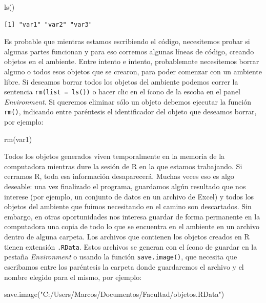 \documentclass[
]{book}
\newenvironment{Shaded}{\begin{snugshade}}{\end{snugshade}}
\newcommand{\FunctionTok}[1]{\textcolor[rgb]{0.00,0.00,0.00}{#1}}
\newcommand{\NormalTok}[1]{#1}
\newcommand{\StringTok}[1]{\textcolor[rgb]{0.31,0.60,0.02}{#1}}
\begin{document}
\begin{Shaded}
\begin{Highlighting}[]
\FunctionTok{ls}\NormalTok{()}
\end{Highlighting}
\end{Shaded}

\begin{verbatim}
[1] "var1" "var2" "var3"
\end{verbatim}

Es probable que mientras estamos escribiendo el código, necesitemos probar si algunas partes funcionan y para eso corremos algunas líneas de código, creando objetos en el ambiente. Entre intento e intento, probablemnte necesitemos borrar alguno o todos esos objetos que se crearon, para poder comenzar con un ambiente libre. Si deseamos borrar todos los objetos del ambiente podemos correr la sentencia \texttt{rm(list\ =\ ls())} o hacer clic en el ícono de la escoba en el panel \emph{Environment}. Si queremos eliminar sólo un objeto debemos ejecutar la función \texttt{rm()}, indicando entre paréntesis el identificador del objeto que deseamos borrar, por ejemplo:

\begin{Shaded}
\begin{Highlighting}[]
\FunctionTok{rm}\NormalTok{(var1)}
\end{Highlighting}
\end{Shaded}

Todos los objetos generados viven temporalmente en la memoria de la computadora mientras dure la sesión de R en la que estamos trabajando. Si cerramos R, toda esa información desaparecerá. Muchas veces eso es algo deseable: una vez finalizado el programa, guardamos algún resultado que nos interese (por ejemplo, un conjunto de datos en un archivo de Excel) y todos los objetos del ambiente que fuimos necesitando en el camino son descartados. Sin embargo, en otras oportunidades nos interesa guardar de forma permanente en la computadora una copia de todo lo que se encuentra en el ambiente en un archivo dentro de alguna carpeta. Los archivos que contienen los objetos creados en R tienen extensión \texttt{.RData}. Estos archivos se generan con el ícono de guardar en la pestaña \emph{Environment} o usando la función \texttt{save.image()}, que necesita que escribamos entre los paréntesis la carpeta donde guardaremos el archivo y el nombre elegido para el mismo, por ejemplo:

\begin{Shaded}
\begin{Highlighting}[]
\FunctionTok{save.image}\NormalTok{(}\StringTok{"C:/Users/Marcos/Documentos/Facultad/objetos.RData"}\NormalTok{)}
\end{Highlighting}
\end{Shaded}
\end{document}
